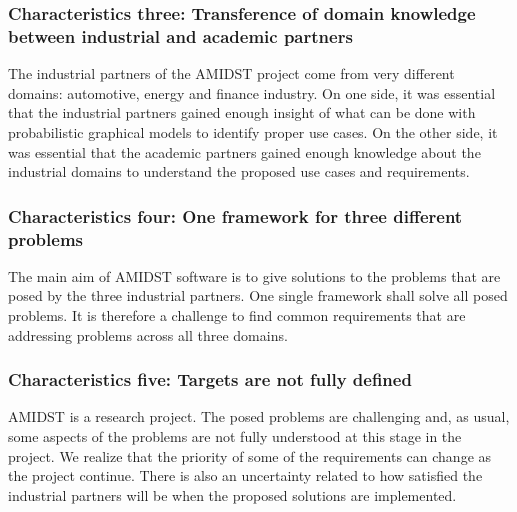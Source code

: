 \subsubsection*{Characteristics three: Transference of domain knowledge between industrial and academic partners}
\label{sec:characteristic3}

The industrial partners of the AMIDST project come from very different domains: automotive, energy and finance industry.  On one side, it was essential that the industrial partners gained enough insight of what can be done with probabilistic graphical models to identify proper use cases.  On the other side, it was essential that the academic partners gained enough knowledge about the industrial domains to understand the proposed use cases and requirements.

\subsubsection*{Characteristics four:  One framework for three different problems}
\label{sec:characteristic4}

The main aim of AMIDST software is to give solutions to the problems that are posed by the three industrial partners.  One single framework shall solve all posed problems.  It is therefore a challenge to find common requirements that are addressing problems across all three domains.

\subsubsection*{Characteristics five: Targets are not fully defined}
\label{sec:characteristic5}

AMIDST is a research project. The posed problems are challenging and, as usual, some aspects of the problems are not fully understood at this stage in the project. We realize that the priority of some of the requirements can change as the project continue. There is also an uncertainty related to how satisfied the industrial partners will be when the proposed solutions are implemented.  


